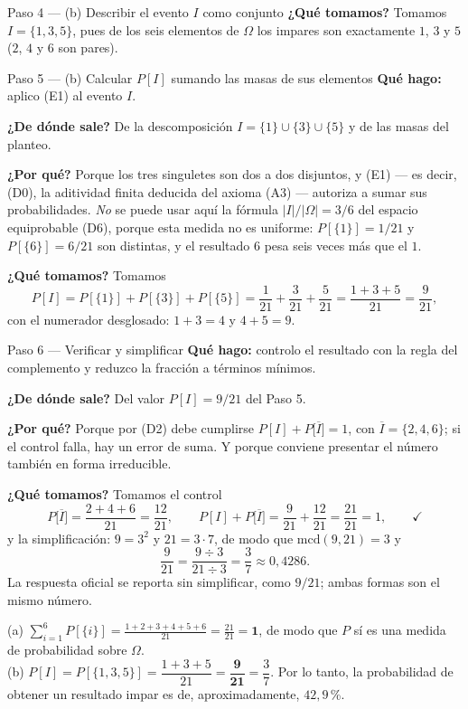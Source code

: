\documentclass[11pt]{article}
\begin{document}
\begin{sol}
\begin{paso}{Paso 4 --- (b) Describir el evento $I$ como conjunto}
\textbf{¿Qué tomamos?} Tomamos $I=\{1,3,5\}$, pues de los seis elementos de $\Omega$ los
impares son exactamente $1$, $3$ y $5$ ($2$, $4$ y $6$ son pares).
\end{paso}

\begin{paso}{Paso 5 --- (b) Calcular $P[I]$ sumando las masas de sus elementos}
\textbf{Qué hago:} aplico (E1) al evento $I$.

\textbf{¿De dónde sale?} De la descomposición $I=\{1\}\cup\{3\}\cup\{5\}$ y de las masas del
planteo.

\textbf{¿Por qué?} Porque los tres singuletes son dos a dos disjuntos, y (E1) --- es decir,
(D0), la aditividad finita deducida del axioma (A3) --- autoriza a sumar sus probabilidades.
\emph{No} se puede usar aquí la fórmula $|I|/|\Omega|=3/6$ del espacio equiprobable (D6), porque
esta medida no es uniforme: $P[\{1\}]=1/21$ y $P[\{6\}]=6/21$ son distintas, y el resultado $6$
pesa seis veces más que el $1$.

\textbf{¿Qué tomamos?} Tomamos
\[
P[I]=P[\{1\}]+P[\{3\}]+P[\{5\}]
=\frac{1}{21}+\frac{3}{21}+\frac{5}{21}
=\frac{1+3+5}{21}
=\frac{9}{21},
\]
con el numerador desglosado: $1+3=4$ y $4+5=9$.
\end{paso}

\begin{paso}{Paso 6 --- Verificar y simplificar}
\textbf{Qué hago:} controlo el resultado con la regla del complemento y reduzco la fracción a
términos mínimos.

\textbf{¿De dónde sale?} Del valor $P[I]=9/21$ del Paso 5.

\textbf{¿Por qué?} Porque por (D2) debe cumplirse $P[I]+P\big[\overline{I}\big]=1$, con
$\overline{I}=\{2,4,6\}$; si el control falla, hay un error de suma. Y porque conviene presentar
el número también en forma irreducible.

\textbf{¿Qué tomamos?} Tomamos el control
\[
P\big[\overline{I}\big]=\frac{2+4+6}{21}=\frac{12}{21},
\qquad
P[I]+P\big[\overline{I}\big]=\frac{9}{21}+\frac{12}{21}=\frac{21}{21}=1 , \qquad\checkmark
\]
y la simplificación: $9=3^{2}$ y $21=3\cdot 7$, de modo que $\mathrm{mcd}(9,21)=3$ y
\[
\frac{9}{21}=\frac{9\div 3}{21\div 3}=\frac{3}{7}\approx 0{,}4286 .
\]
La respuesta oficial se reporta sin simplificar, como $9/21$; ambas formas son el mismo número.
\end{paso}

\end{sol}

\begin{resp}
(a) $\displaystyle\sum_{i=1}^{6}P[\{i\}]=\frac{1+2+3+4+5+6}{21}=\frac{21}{21}=\mathbf{1}$, de modo
que $P$ sí es una medida de probabilidad sobre $\Omega$.\\[4pt]
(b) $P[I]=P[\{1,3,5\}]=\dfrac{1+3+5}{21}=\mathbf{\dfrac{9}{21}}=\dfrac{3}{7}$. Por lo tanto, la
probabilidad de obtener un resultado impar es de, aproximadamente, $42{,}9$\,\%.
\end{resp}
\end{document}
